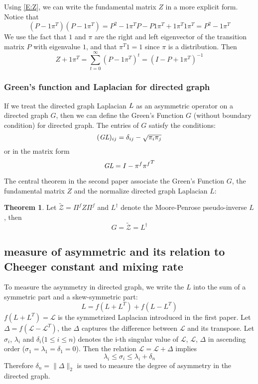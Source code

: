 \documentclass[twoside]{article}
\theoremstyle{definition}
\newtheorem{thm}{Theorem}[section]
\theoremstyle{definition}
\theoremstyle{remark}
\def\L{{\mathcal L}}
\begin{document}
Using \eqref{E:Z}, we can write the fundamental matrix $Z$ in a more explicit form. Notice that
\begin{equation}
  (P - 1 \pi^T)(P - 1 \pi^T) = P^2 - 1 \pi^T P - P 1 \pi^T + 1 \pi^T 1 \pi^T = P^2 - 1 \pi^T
\end{equation}
We use the fact that $1$ and $\pi$ are the right and left eigenvector of the transition matrix $P$ with eigenvalue $1$, and that $\pi^T 1 = 1$ since $\pi$ is a distribution. Then
\begin{equation}
  Z + 1\pi^T = \sum_{t=0}^{\infty} (P - 1\pi^T)^t = (I - P + 1\pi^T)^{-1}
\end{equation}

\subsubsection{Green's function and Laplacian for directed graph}
If we treat the directed graph Laplacian $\emph{L}$ as an asymmetric operator on a directed graph $G$, then we can define the Green's Function $G$ (without boundary condition) for directed graph. The entries of $G$ satisfy the conditions:
\begin{equation}
  (\emph{GL})_{ij} = \delta_{ij} - \sqrt{\pi_i\pi_j}
\end{equation}
or in the matrix form
\begin{equation}
  \emph{GL}  = I - \pi^f{\pi^f}^T
\end{equation}

The central theorem in the second paper associate the Green's Function $G$, the fundamental matrix $Z$ and the normalize directed graph Laplacian $L$:
\begin{thm}
Let $\tilde{\mathcal{Z}} = \Pi^f Z \Pi^f$ and $L^{\dagger}$ denote the Moore-Penrose pseudo-inverse $L$, then
\begin{equation}
  G = \tilde{\mathcal{Z}} = L^{\dagger}
\end{equation}
\end{thm}
\subsection{measure of asymmetric and its relation to Cheeger constant and mixing rate}
To measure the asymmetry in directed graph, we write the $L$ into the sum of a symmetric part and a skew-symmetric part:
\begin{equation}
  L = f (L + L ^T) + f (L - L^T)
\end{equation}
$f (L + L ^T) = \L$ is the symmetrized Laplacian introduced in the first paper. Let $\Delta = f (\L - \L ^T)$, the $\Delta$ captures the difference between $\L$ and its transpose. Let $\sigma_i$, $\lambda_i$ and $\delta_i$($1\le i \le n$) denotes the i-th singular value of $\L$, $\L$, $\Delta$ in ascending order ($\sigma_1 = \lambda_1 = \delta_1 = 0$). Then the relation $\L = \L + \Delta$ implies
\begin{equation}
  \lambda_i \le \sigma_i \le \lambda_i + \delta_n
\end{equation}
Therefore $\delta_n = \| \Delta \|_2$ is used to measure the degree of asymmetry in the directed graph.
\end{document}
